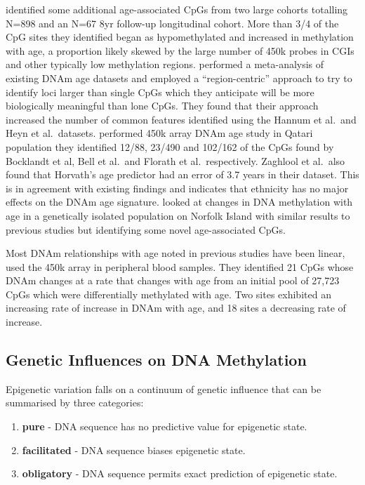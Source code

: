\documentclass[]{book}
\begin{document}
\citet{Florath2014} identified some additional age-associated CpGs from two large cohorts totalling N=898 and an N=67 8yr follow-up longitudinal cohort. More than 3/4 of the CpG sites they identified began as hypomethylated and increased in methylation with age, a proportion likely skewed by the large number of 450k probes in CGIs and other typically low methylation regions. \citet{Bacalini2015} performed a meta-analysis of existing DNAm age datasets and employed a ``region-centric'' approach to try to identify loci larger than single CpGs which they anticipate will be more biologically meaningful than lone CpGs. They found that their approach increased the number of common features identified using the Hannum et al.~and Heyn et al.~datasets. \citet{Zaghlool2015} performed 450k array DNAm age study in Qatari population they identified 12/88, 23/490 and 102/162 of the CpGs found by Bocklandt et al, Bell et al.~and Florath et al.~respectively. Zaghlool et al.~also found that Horvath's age predictor had an error of 3.7 years in their dataset. This is in agreement with existing findings and indicates that ethnicity has no major effects on the DNAm age signature. \citet{Benton2017} looked at changes in DNA methylation with age in a genetically isolated population on Norfolk Island with similar results to previous studies but identifying some novel age-associated CpGs.

Most DNAm relationships with age noted in previous studies have been linear, \citet{Johnson2017} used the 450k array in peripheral blood samples. They identified 21 CpGs whose DNAm changes at a rate that changes with age from an initial pool of 27,723 CpGs which were differentially methylated with age. Two sites exhibited an increasing rate of increase in DNAm with age, and 18 sites a decreasing rate of increase.

\hypertarget{genetic-influences-on-dna-methylation}{%
\subsection{Genetic Influences on DNA Methylation}\label{genetic-influences-on-dna-methylation}}

Epigenetic variation falls on a continuum of genetic influence that can be summarised by three categories:

\begin{enumerate}
\def\labelenumi{\arabic{enumi}.}
\item
  \textbf{pure} - DNA sequence has no predictive value for epigenetic state.
\item
  \textbf{facilitated} - DNA sequence biases epigenetic state.
\item
  \textbf{obligatory} - DNA sequence permits exact prediction of epigenetic state.
\end{enumerate}
\end{document}
